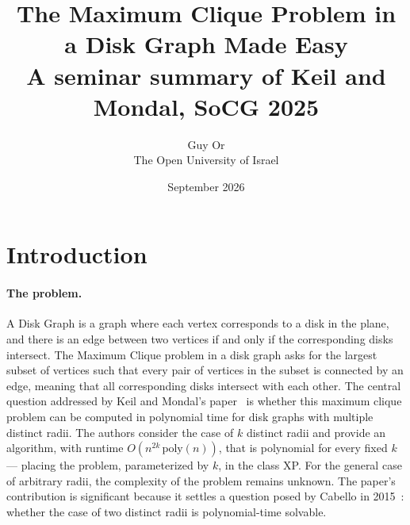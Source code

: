 \documentclass[12pt]{article}
\title{The Maximum Clique Problem in a Disk Graph Made Easy\\
\large A seminar summary of Keil and Mondal, SoCG 2025}
\author{Guy Or \\ The Open University of Israel}
\date{September 2026}
\begin{document}
\maketitle

\section{Introduction}\label{sec:intro}

\paragraph{The problem.}
A Disk Graph is a graph where each vertex corresponds to a disk in the plane, and there is an edge between two vertices if and only if the corresponding disks intersect.
The Maximum Clique problem in a disk graph asks for the largest subset of vertices such that every pair of vertices in the subset is connected by an edge, meaning that all corresponding disks intersect with each other.
The central question addressed by Keil and Mondal's paper~\cite{keil2025clique} is whether this maximum clique problem can be computed in polynomial time for disk graphs with multiple distinct radii.
The authors consider the case of $k$ distinct radii and provide an algorithm, with runtime $O(n^{2k}\,\mathrm{poly}(n))$, that is polynomial for every fixed $k$ --- placing the problem, parameterized by $k$, in the class XP.
For the general case of arbitrary radii, the complexity of the problem remains unknown.
The paper's contribution is significant because it settles a question posed by Cabello in 2015~\cite{cabello2015open}: whether the case of two distinct radii is polynomial-time solvable.
\end{document}
